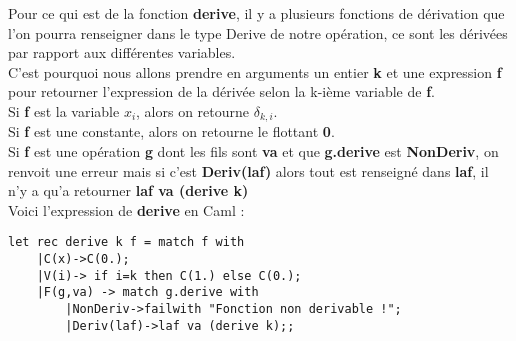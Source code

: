 \documentclass{article}
\theoremstyle{definition}
\begin{document}
Pour ce qui est de la fonction \textbf{derive}, il y a plusieurs fonctions de d\'erivation que l'on pourra renseigner dans le type Derive de notre op\'eration, ce sont les d\'eriv\'ees par rapport aux diff\'erentes variables. \\C'est pourquoi nous allons prendre en arguments un entier \textbf{k} et une expression \textbf{f} pour retourner l'expression de la d\'eriv\'ee selon la k-i\`eme variable de \textbf{f}.\\
Si \textbf{f} est la variable $x_i$, alors on retourne $\delta_{k,i}$.\\
Si \textbf{f} est une constante, alors on retourne le flottant \textbf{0}.\\
Si \textbf{f} est une op\'eration \textbf{g} dont les fils sont \textbf{va} et que \textbf{g.derive} est \textbf{NonDeriv}, on renvoit une erreur mais si c'est \textbf{Deriv(laf)} alors tout est renseign\'e dans \textbf{laf}, il n'y a qu'a retourner \textbf{laf va (derive k)}\\
Voici l'expression de \textbf{derive} en Caml : \\
\begin{lstlisting}
let rec derive k f = match f with
	|C(x)->C(0.);
	|V(i)-> if i=k then C(1.) else C(0.);
	|F(g,va) -> match g.derive with 
		|NonDeriv->failwith "Fonction non derivable !";
		|Deriv(laf)->laf va (derive k);;
\end{lstlisting}
\end{document}
